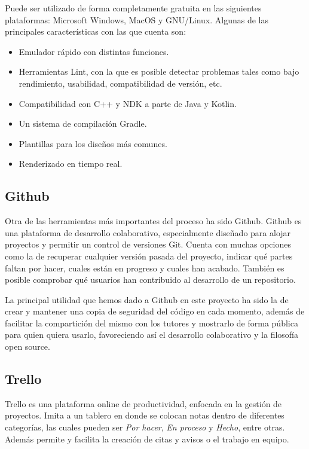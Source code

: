 Puede ser utilizado de forma completamente gratuita en las siguientes plataformas: Microsoft Windows, MacOS y GNU/Linux. Algunas de las principales características con las que cuenta son:
\begin{itemize}
    \item Emulador rápido con distintas funciones.
    \item Herramientas Lint, con la que es posible detectar problemas tales como bajo rendimiento, usabilidad, compatibilidad de versión, etc.
    \item Compatibilidad con C++ y NDK a parte de Java y Kotlin.
    \item Un sistema de compilación Gradle.
    \item Plantillas para los diseños más comunes.
    \item Renderizado en tiempo real.
\end{itemize}

\subsection{Github}
Otra de las herramientas más importantes del proceso ha sido Github. Github es una plataforma de desarrollo colaborativo, especialmente diseñado para alojar proyectos y permitir un control de versiones Git. Cuenta con muchas opciones como la de recuperar cualquier versión pasada del proyecto, indicar qué partes faltan por hacer, cuales están en progreso y cuales han acabado. También es posible comprobar qué usuarios han contribuido al desarrollo de un repositorio\cite{github_wikipedia}.

La principal utilidad que hemos dado a Github en este proyecto ha sido la de crear y mantener una copia de seguridad del código en cada momento, además de facilitar la compartición del mismo con los tutores y mostrarlo de forma pública para quien quiera usarlo, favoreciendo así el desarrollo colaborativo y la filosofía open source.

\subsection{Trello}
Trello es una plataforma online de productividad, enfocada en la gestión de proyectos. Imita a un tablero en donde se colocan notas dentro de diferentes categorías, las cuales pueden ser \textit{Por hacer}, \textit{En proceso} y \textit{Hecho}, entre otras. Además permite y facilita la creación de citas y avisos o el trabajo en equipo\cite{trello}.

